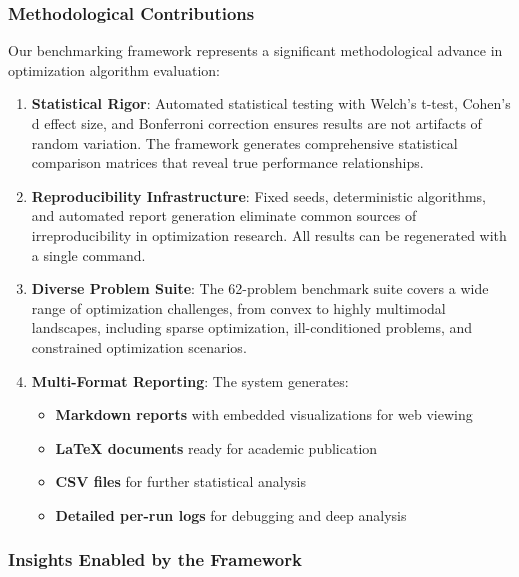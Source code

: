 \hypertarget{methodological-contributions}{%
\subsubsection{Methodological Contributions}\label{methodological-contributions}}

Our benchmarking framework represents a significant methodological advance in optimization algorithm evaluation:

\begin{enumerate}
\def\labelenumi{\arabic{enumi}.}
\item
  \textbf{Statistical Rigor}: Automated statistical testing with Welch's t-test, Cohen's d effect size, and Bonferroni correction ensures results are not artifacts of random variation. The framework generates comprehensive statistical comparison matrices that reveal true performance relationships.
\item
  \textbf{Reproducibility Infrastructure}: Fixed seeds, deterministic algorithms, and automated report generation eliminate common sources of irreproducibility in optimization research. All results can be regenerated with a single command.
\item
  \textbf{Diverse Problem Suite}: The 62-problem benchmark suite covers a wide range of optimization challenges, from convex to highly multimodal landscapes, including sparse optimization, ill-conditioned problems, and constrained optimization scenarios.
\item
  \textbf{Multi-Format Reporting}: The system generates:

  \begin{itemize}
  \tightlist
  \item
    \textbf{Markdown reports} with embedded visualizations for web viewing
  \item
    \textbf{LaTeX documents} ready for academic publication
  \item
    \textbf{CSV files} for further statistical analysis
  \item
    \textbf{Detailed per-run logs} for debugging and deep analysis
  \end{itemize}
\end{enumerate}

\hypertarget{insights-enabled-by-the-framework}{%
\subsubsection{Insights Enabled by the Framework}\label{insights-enabled-by-the-framework}}

